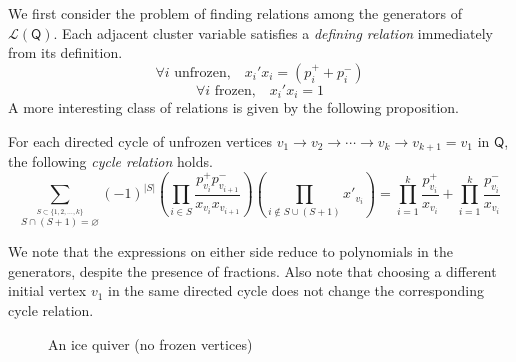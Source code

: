 \documentclass[ALCO,published]{cedram}
\numberwithin{equation}{section}
\renewcommand{\L}{\mathcal{L}}%
\renewcommand{\emptyset}{\varnothing}
\newcommand{\1}{^{-1}}
\def\Q{\mathsf{Q}}
\begin{document}
We first consider the problem of finding relations among the generators of $\L(\Q)$.
%
%
Each adjacent cluster variable satisfies a \textit{defining relation} immediately from its definition.
\begin{equation}
\forall i \text{ unfrozen} ,\; \;\; x_i'x_i = (p_i^++p_i^-) 
\end{equation}
\begin{equation}
\forall i \text{ frozen} ,\; \;\;x_i'x_i =1
\end{equation}
A more interesting class of relations is given by the following proposition.
\begin{prop}\label{prop: cyclerels}
For each directed cycle of unfrozen vertices $v_1\rightarrow v_2 \rightarrow \cdots \rightarrow v_k\rightarrow v_{k+1}=v_1$ in $\Q$, the following \textit{cycle relation} holds.
\begin{equation}%
\sum_{\stackrel{S\subset \{1,2,\dots,k\}}{S\cap (S+1)=\emptyset}} (-1)^{|S|}\left(\prod_{i\in S} \frac{p_{v_i}^+p_{v_{i+1}}^-}{x_{v_i}x_{v_{i+1}}}\right)\left(\prod_{i\not\in S\cup (S+1)} x'_{v_i}\right) = \prod_{i=1}^k\frac{p_{v_i}^+}{x_{v_i}}+ \prod_{i=1}^k\frac{p_{v_i}^-}{x_{v_i}}
\end{equation}
\end{prop}
\noindent We note that the expressions on either side reduce to polynomials in the generators, despite the presence of fractions.  Also note that choosing a different initial vertex $v_1$ in the same directed cycle does not change the corresponding cycle relation.


\begin{figure}[h!t]
\caption{An ice quiver (no frozen vertices)}
\label{fig: 3cycle}
\end{figure}
\end{document}
